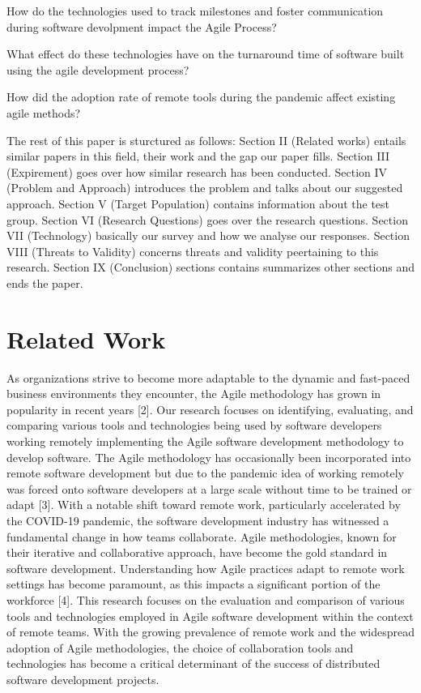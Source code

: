 \documentclass[conference]{IEEEtran}
\begin{document}
How do the technologies used to track milestones and foster communication during software devolpment impact the Agile Process?

What effect do these technologies have on the turnaround time of software built using the agile development process?

How did the adoption rate of remote tools during the pandemic affect existing agile methods?

The rest of this paper is sturctured as follows: Section II (Related works) entails similar papers in this field, their work and the gap our paper fills. Section III (Expirement) goes over how similar research has been conducted. Section IV (Problem and Approach) introduces the problem and talks about our suggested approach. Section V (Target Population) contains information about the test group. Section VI (Research Questions) goes over the research questions. Section VII (Technology) basically our survey and how we analyse our responses. Section VIII (Threats to Validity) concerns threats and validity peertaining to this research. Section IX (Conclusion) sections contains summarizes other sections and ends the paper.

\section{Related Work}
As organizations strive to become more adaptable to the dynamic and fast-paced business environments they encounter, the Agile methodology has grown in popularity in recent years [2]. Our research focuses on identifying, evaluating, and comparing various tools and technologies being used by software developers working remotely implementing the Agile software development methodology to develop software. The Agile methodology has occasionally been incorporated into remote software development but due to the pandemic idea of working remotely was forced onto software developers at a large scale without time to be trained or adapt [3]. With a notable shift toward remote work, particularly accelerated by the COVID-19 pandemic, the software development industry has witnessed a fundamental change in how teams collaborate. Agile methodologies, known for their iterative and collaborative approach, have become the gold standard in software development. Understanding how Agile practices adapt to remote work settings has become paramount, as this impacts a significant portion of the workforce [4]. This research focuses on the evaluation and comparison of various tools and technologies employed in Agile software development within the context of remote teams. With the growing prevalence of remote work and the widespread adoption of Agile methodologies, the choice of collaboration tools and technologies has become a critical determinant of the success of distributed software development projects.
\end{document}
